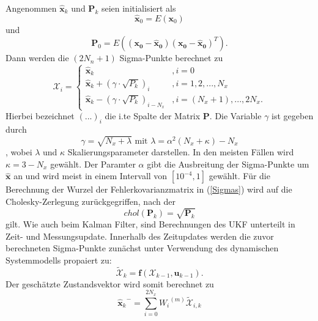 Angenommen $\mathbf{\hat x}_k$ und $\mathbf{P}_k$ seien initialisiert als
\begin{equation}\label{x0}
  \mathbf{\hat x}_0 = E (\mathbf{x}_0)
\end{equation}
und
\begin{equation}\label{P0}
  \mathbf{P}_0 = E((\mathbf{x_0 - \hat x_0})(\mathbf{x_0 - \hat x_0})^T) .
\end{equation}
Dann werden die $(2N_n+1)$ Sigma-Punkte berechnet zu
\begin{equation}\label{Sigmas}
  \mathbf{\mathcal{X}}_i =
  \begin{cases}
    \mathbf{\hat x}_k & , i=0 \\
    \mathbf{\hat x}_k + (\gamma \cdot \sqrt {P_k})_i & , i = 1,2,...,N_x \\
    \mathbf{\hat x}_k - (\gamma \cdot \sqrt {P_k})_{i-N_x} & , i=(N_x+1),...,2N_x.
  \end{cases}
\end{equation}
Hierbei bezeichnet $(...)_i$ die i.te Spalte der Matrix $\mathbf{P}$. Die Variable $\gamma$ ist gegeben durch
\begin{equation}\label{c}
  \gamma = \sqrt {N_x+\lambda}  \text{ mit } \lambda = \alpha^2(N_x+\kappa)-N_x
\end{equation}
, wobei $\lambda$ und $\kappa$ Skalierungsparameter darstellen. In den meisten Fällen wird  $\kappa = 3 - N_x$ gewählt. Der Paramter $\alpha$ gibt die Ausbreitung der Sigma-Punkte um $\mathbf{\hat x}$ an und wird meist in einem Intervall von $[10^{-4},1]$ gewählt. Für die Berechnung der Wurzel der Fehlerkovarianzmatrix in (\ref{Sigmas}) wird auf die Cholesky-Zerlegung zurückgegriffen, nach der
\begin{equation}\label{chol}
    chol(\mathbf{P}_k) = \sqrt {\mathbf{P}_k}
\end{equation}
gilt.
Wie auch beim Kalman Filter, sind Berechnungen des UKF unterteilt in Zeit- und Messungsupdate.
Innerhalb des Zeitupdates werden die zuvor berechneten Sigma-Punkte zunächst unter Verwendung des dynamischen Systemmodells propaiert zu:
\begin{equation}\label{prop.sigma1}
  \mathbf{\tilde {\mathcal{X}}}_k = \mathbf{f}(\mathbf{\mathcal{X}}_{k-1},\mathbf{u}_{k-1}) .
\end{equation}
Der geschätzte Zustandsvektor wird somit berechnet zu
\begin{equation}\label{xk-ukf}
  {\mathbf{\hat x}_{k}}^- = \sum_{i=0}^{2N_x} {{W_i}^{(m)}\mathbf{\tilde {\mathcal{X}}}_{i,k}}
\end{equation}
